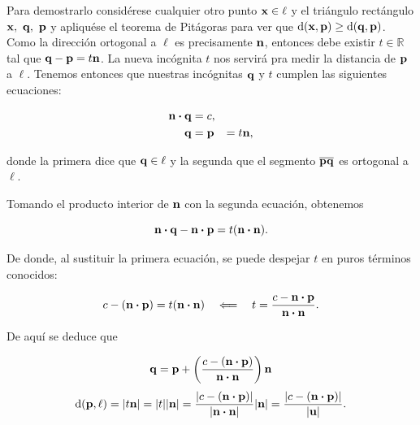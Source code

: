 \documentclass{article}
\theoremstyle{definicion}
\theoremstyle{definition}             %
\theoremstyle{definition}             %
\theoremstyle{definition}
\theoremstyle{definition}
\theoremstyle{observacion}
\theoremstyle{definition}
\theoremstyle{plain}
\theoremstyle{definition}
\theoremstyle{afirmacion}
\theoremstyle{notation}
\theoremstyle{definition}
\begin{document}

        Para demostrarlo considérese cualquier otro punto \(\vb{x} \in \ell\) y el triángulo rectángulo \(\vb{x},\ \vb{q},\ \vb{p}\) y apliquése el teorema de Pitágoras para ver que \(\textrm{d}(\vb{x}, \vb{p}) \geq \textrm{d}(\vb{q}, \vb{p})\). Como la dirección ortogonal a \(\ell\) es precisamente \(\vb{n}\), entonces debe existir \(t \in \mathbb{R}\) tal que \(\vb{q} - \vb{p} = t\vb{n}\). La nueva incógnita \(t\) nos servirá pra medir la distancia de \(\vb{p}\) a \(\ell\). Tenemos entonces que nuestras incógnitas \(\vb{q}\) y \(t\) cumplen las siguientes ecuaciones:

        \begin{align*}
            \vb{n} \vdot \vb{q} &= c,\\
            \vb{q} &= \vb{p} &= t\vb{n},\\
        \end{align*}

        donde la primera dice que \(\vb{q} \in \ell\) y la segunda que el segmento \(\overline{\vb{p}\vb{q}}\) es ortogonal a \(\ell\).
        
        Tomando el producto interior de \(\vb{n}\) con la segunda ecuación, obtenemos

        \begin{equation*}
            \vb{n} \vdot \vb{q} - \vb{n} \vdot \vb{p} = t(\vb{n} \vdot \vb{n}).
        \end{equation*}

        De donde, al sustituir la primera ecuación, se puede despejar \(t\) en puros términos conocidos:

        \begin{equation*}
            c - (\vb{n} \vdot \vb{p}) = t (\vb{n} \vdot \vb{n})\quad \Longleftarrow\quad t = \dfrac{c - \vb{n} \vdot \vb{p}}{\vb{n} \vdot \vb{n}}.
        \end{equation*}

        De aquí se deduce que 

        \begin{equation*}
            \vb{q} = \vb{p} + \left(\dfrac{c - (\vb{n} \vdot \vb{p})}{\vb{n} \vdot \vb{n}}\right)\vb{n}
        \end{equation*}
        \begin{equation*}
            \textrm{d}(\vb{p}, \ell) = \abs{t\vb{n}} = \abs{t}\abs{\vb{n}} = \dfrac{\abs{c - (\vb{n} \vdot \vb{p})}}{\abs{\vb{n} \vdot \vb{n}}}\abs{\vb{n}} = \dfrac{\abs{c - (\vb{n} \vdot \vb{p})}}{\abs{\vb{u}}}.
        \end{equation*}
\end{document}
